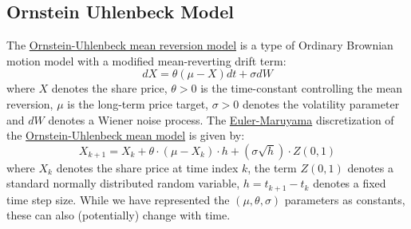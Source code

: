 \documentclass[11pt]{article}
\theoremstyle{definition}
\begin{document}
\subsection{Ornstein Uhlenbeck Model}
The \href{https://en.wikipedia.org/wiki/Ornstein%E2%80%93Uhlenbeck_process}{Ornstein-Uhlenbeck mean reversion model} is a type of Ordinary Brownian motion model with a modified mean-reverting drift term:
\begin{equation}
dX = \theta\left(\mu-X\right)dt + {\sigma}dW
\end{equation}
where $X$ denotes the share price, $\theta>0$ is the time-constant controlling the mean reversion, 
$\mu$ is the long-term price target, $\sigma>0$ denotes the volatility parameter and $dW$ denotes a Wiener noise process.
The \href{https://en.wikipedia.org/wiki/Euler%E2%80%93Maruyama_method}{Euler-Maruyama} discretization of the \href{https://en.wikipedia.org/wiki/Ornstein%E2%80%93Uhlenbeck_process}{Ornstein-Uhlenbeck mean model} is given by:
\begin{equation*}
X_{k+1} = X_{k} + \theta\cdot\left(\mu-X_{k}\right)\cdot{h} + \left(\sigma\sqrt{h}\right)\cdot{Z(0,1)}
\end{equation*}
where $X_{k}$ denotes the share price at time index $k$, the term $Z(0,1)$ denotes a standard normally distributed random variable, 
$h = t_{k+1} - t_{k}$ denotes a fixed time step size. 
While we have represented the $(\mu,\theta,\sigma)$ parameters as constants, these can also (potentially) change with time.
\end{document}
